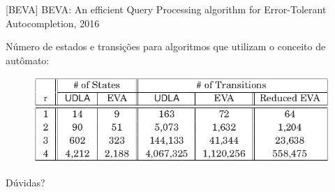 \documentclass[11pt]{beamer}
\begin{document}
\begin{frame}{[BEVA] BEVA: An efficient Query Processing algorithm for Error-Tolerant Autocompletion, 2016}

    Número de estados e transições para algoritmos que utilizam o conceito de autômato:
    
    \begin{figure}
      \includegraphics[scale=0.40]{pictures/automata_size_beva.png}
      \centering
    \end{figure}
   
\end{frame}


\begin{frame}[allowframebreaks]{}

  
%   
  

\end{frame}

{
\begin{frame}[standout]
  Dúvidas?
\end{frame}
}
\end{document}
